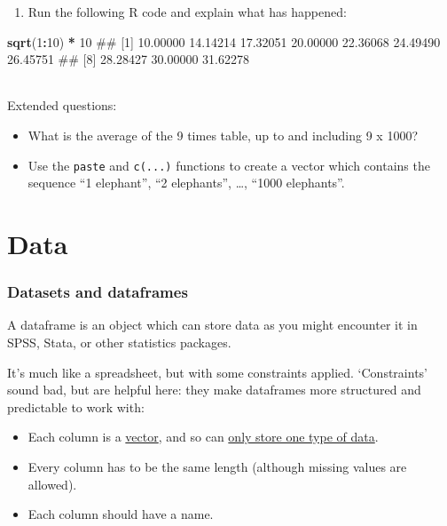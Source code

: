 \documentclass[]{article}
\newenvironment{Shaded}{\begin{snugshade}}{\end{snugshade}}
\newcommand{\KeywordTok}[1]{\textcolor[rgb]{0.13,0.29,0.53}{\textbf{#1}}}
\newcommand{\DecValTok}[1]{\textcolor[rgb]{0.00,0.00,0.81}{#1}}
\newcommand{\StringTok}[1]{\textcolor[rgb]{0.31,0.60,0.02}{#1}}
\newcommand{\OperatorTok}[1]{\textcolor[rgb]{0.81,0.36,0.00}{\textbf{#1}}}
\newcommand{\NormalTok}[1]{#1}
\providecommand{\tightlist}{%
  \setlength{\itemsep}{0pt}\setlength{\parskip}{0pt}}
\let\oldparagraph\paragraph
\renewcommand{\paragraph}[1]{\oldparagraph{#1}\mbox{}}
\theoremstyle{definition}
\theoremstyle{definition}
\theoremstyle{definition}
\theoremstyle{remark}
\begin{document}
\begin{enumerate}
\def\labelenumi{\arabic{enumi}.}
\setcounter{enumi}{2}
\tightlist
\item
  Run the following R code and explain what has happened:
\end{enumerate}

\begin{Shaded}
\begin{Highlighting}[]
\KeywordTok{sqrt}\NormalTok{(}\DecValTok{1}\OperatorTok{:}\DecValTok{10}\NormalTok{) }\OperatorTok{*}\StringTok{ }\DecValTok{10}
\NormalTok{##  [1] 10.00000 14.14214 17.32051 20.00000 22.36068 24.49490 26.45751}
\NormalTok{##  [8] 28.28427 30.00000 31.62278}
\end{Highlighting}
\end{Shaded}

\paragraph{}\label{section-6}

Extended questions:

\begin{itemize}
\item
  What is the average of the 9 times table, up to and including 9 x
  1000?
\item
  Use the \texttt{paste} and \texttt{c(...)} functions to create a
  vector which contains the sequence ``1 elephant'', ``2 elephants'',
  \ldots{}, ``1000 elephants''.
\end{itemize}

\part{Data}\label{data}

\hypertarget{datasets-dataframes}{\section{Datasets and
dataframes}\label{datasets-dataframes}}

A dataframe is an object which can store data as you might encounter it
in SPSS, Stata, or other statistics packages.

It's much like a spreadsheet, but with some constraints applied.
`Constraints' sound bad, but are helpful here: they make dataframes more
structured and predictable to work with:

\begin{itemize}
\item
  Each column is a \protect\hyperlink{vectors-and-lists}{vector}, and so
  can \protect\hyperlink{vectors-and-lists}{only store one type of
  data}.
\item
  Every column has to be the same length (although missing values are
  allowed).
\item
  Each column should have a name.
\end{itemize}
\end{document}
